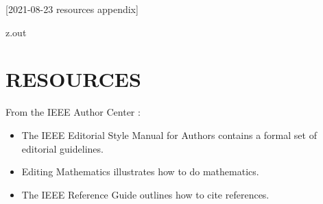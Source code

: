 [2021-08-23 resources appendix]

\begin{VerbatimOut}{z.out}
\chapter{RESOURCES}

From the
IEEE Author Center \cite{ieee-author-center}:
\begin{itemize}
  \item
    The
    IEEE Editorial Style Manual for Authors \cite{ieee-editorial-style-manual-for-authors}
    contains a formal set of editorial guidelines.
  \item
    Editing Mathematics \cite{editing-mathematics}
    illustrates how to do mathematics.
  \item
    The
    IEEE Reference Guide \cite{ieee-reference-guide}
    outlines how to cite references.
\end{itemize}

\end{VerbatimOut}

\MyIO
